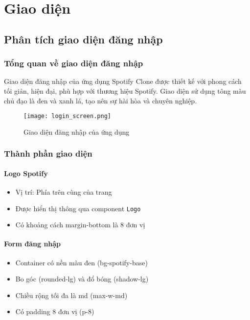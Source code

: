 \chapter{Giao diện}
\section{Phân tích giao diện đăng nhập}

\subsection{Tổng quan về giao diện đăng nhập}
Giao diện đăng nhập của ứng dụng Spotify Clone được thiết kế với phong cách tối giản, hiện đại, phù hợp với thương hiệu Spotify. Giao diện sử dụng tông màu chủ đạo là đen và xanh lá, tạo nên sự hài hòa và chuyên nghiệp.

\begin{figure}[h!]
\centering
\texttt{[image: login\_screen.png]}
\caption{Giao diện đăng nhập của ứng dụng}
\label{fig:login}
\end{figure}

\subsection{Thành phần giao diện}

\subsubsection{Logo Spotify}
\begin{itemize}
    \item Vị trí: Phía trên cùng của trang
    \item Được hiển thị thông qua component \texttt{Logo}
    \item Có khoảng cách margin-bottom là 8 đơn vị
\end{itemize}

\subsubsection{Form đăng nhập}
\begin{itemize}
    \item Container có nền màu đen (bg-spotify-base)
    \item Bo góc (rounded-lg) và đổ bóng (shadow-lg)
    \item Chiều rộng tối đa là md (max-w-md)
    \item Có padding 8 đơn vị (p-8)
\end{itemize}

